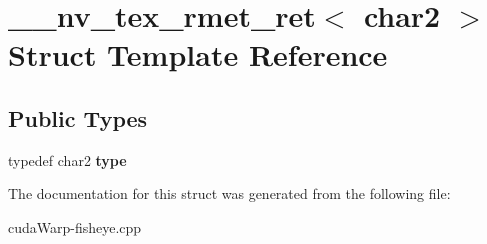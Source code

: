 \hypertarget{struct____nv__tex__rmet__ret_3_01char2_01_4}{}\section{\+\_\+\+\_\+nv\+\_\+tex\+\_\+rmet\+\_\+ret$<$ char2 $>$ Struct Template Reference}
\label{struct____nv__tex__rmet__ret_3_01char2_01_4}
\subsection*{Public Types}
\begin{DoxyCompactItemize}
\item 
typedef char2 {\bfseries type}\hypertarget{struct____nv__tex__rmet__ret_3_01char2_01_4_aea31d29ee421e5ea0da4444ba70ad7e4}{}\label{struct____nv__tex__rmet__ret_3_01char2_01_4_aea31d29ee421e5ea0da4444ba70ad7e4}

\end{DoxyCompactItemize}


The documentation for this struct was generated from the following file\+:\begin{DoxyCompactItemize}
\item 
cuda\+Warp-\/fisheye.\+cpp\end{DoxyCompactItemize}

